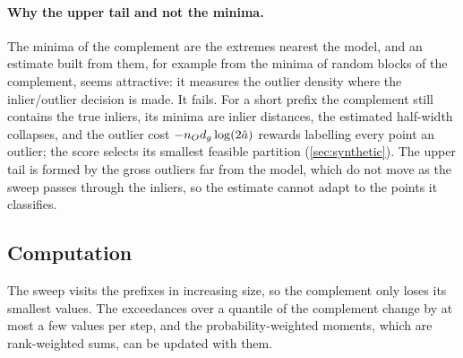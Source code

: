 \paragraph{Why the upper tail and not the minima.}
\label{sec:why-maxima}
The minima of the complement are the extremes nearest the model, and an
estimate built from them, for example from the minima of random blocks of
the complement, seems attractive: it measures the outlier density where the
inlier/outlier decision is made.  It fails.  For a short prefix the
complement still contains the true inliers, its minima are inlier
distances, the estimated half-width collapses, and the outlier cost
$-n_O d_g\log(2\hat a)$ rewards labelling every point an outlier; the score
selects its smallest feasible partition (\cref{sec:synthetic}).  The upper
tail is formed by the gross outliers far from the model, which do not move
as the sweep passes through the inliers, so the estimate cannot adapt to
the points it classifies.

\subsection{Computation}
\label{sec:computation}

The sweep visits the prefixes in increasing size, so the complement only
loses its smallest values.  The exceedances over a quantile of the
complement change by at most a few values per step, and the
probability-weighted moments, which are rank-weighted sums, can be updated
with them.  

